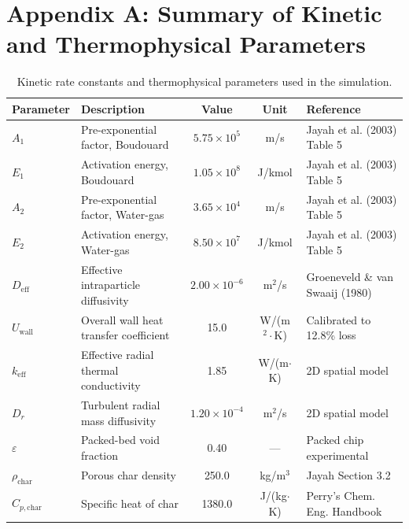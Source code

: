 \documentclass[11pt,a4paper]{article}
\begin{document}
\section{Appendix A: Summary of Kinetic and Thermophysical Parameters}
\begin{table}[H]
    \centering
    \caption{Kinetic rate constants and thermophysical parameters used in the simulation.}
    \label{tab:app_params}
    \small
    \begin{tabular}{llccl}
        \toprule
        \textbf{Parameter} & \textbf{Description} & \textbf{Value} & \textbf{Unit} & \textbf{Reference} \\
        \midrule
        $A_1$ & Pre-exponential factor, Boudouard & $5.75 \times 10^5$ & m/s & Jayah et al. (2003) Table 5 \\
        $E_1$ & Activation energy, Boudouard & $1.05 \times 10^8$ & J/kmol & Jayah et al. (2003) Table 5 \\
        $A_2$ & Pre-exponential factor, Water-gas & $3.65 \times 10^4$ & m/s & Jayah et al. (2003) Table 5 \\
        $E_2$ & Activation energy, Water-gas & $8.50 \times 10^7$ & J/kmol & Jayah et al. (2003) Table 5 \\
        $D_{\text{eff}}$ & Effective intraparticle diffusivity & $2.00 \times 10^{-6}$ & m$^2$/s & Groeneveld \& van Swaaij (1980) \\
        $U_{\text{wall}}$ & Overall wall heat transfer coefficient & 15.0 & W/(m$^2\cdot$K) & Calibrated to 12.8\% loss \\
        $k_{\text{eff}}$ & Effective radial thermal conductivity & 1.85 & W/(m$\cdot$K) & 2D spatial model \\
        $D_r$ & Turbulent radial mass diffusivity & $1.20 \times 10^{-4}$ & m$^2$/s & 2D spatial model \\
        $\varepsilon$ & Packed-bed void fraction & 0.40 & --- & Packed chip experimental \\
        $\rho_{\text{char}}$ & Porous char density & 250.0 & kg/m$^3$ & Jayah Section 3.2 \\
        $C_{p,\text{char}}$ & Specific heat of char & 1380.0 & J/(kg$\cdot$K) & Perry's Chem. Eng. Handbook \\
        \bottomrule
    \end{tabular}
\end{table}
\end{document}
